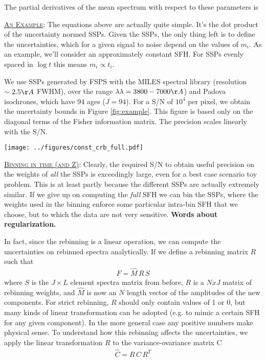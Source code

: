 \documentclass{article}
\begin{document}
The partial derivatives of the mean spectrum with respect to these parameters is 


\underline{\textsc{An Example}}:  
The equations above are actually quite simple.  
It's the dot product of the uncertainty normed SSPs. 
Given the SSPs, the only thing left is to define the uncertainties, which for a given signal to noise depend on the values of $m_i$.  
As an example, we'll consider an approximately constant SFH.  For SSPs evenly spaced in $\log t$ this means $m_i \propto t_i$.

We use SSPs generated by FSPS with 
the MILES spectral library (resolution $\sim 2.5\AA$ FWHM), over the range $\lambda\lambda = 3800-7000\AA$) and 
Padova isochrones, which have 94 ages ($J=94$).
For a S/N of $10^4$ per pixel, we obtain the uncertainty bounds in Figure \ref{fig:example}.
This figure is based only on the diagonal terms of the Fisher information matrix.
The precision scales linearly with the S/N.

\begin{figure*}[h!]
\texttt{[image: ../figures/const\_crb\_full.pdf]}
\caption{Top: Input masses and Cramer-Rao bound for a constant SFH, single metallicity, and S/N$= 10^4$, when including all 94 isochrone ages.  Bottom: Ratio of the input mass to the Cramer-Rao bound. 
\label{fig:example}}
\end{figure*}



\underline{\textsc{Binning in time (and Z)}}:
Clearly, the required S/N to obtain useful precision on the weights of \emph{all} the SSPs is exceedingly large, even for a best case scenario toy problem.  
This is at least partly because the different SSPs are actually extremely similar.  
If we give up on computing the \emph{full} SFH we can bin the SSPs, 
where the weights used in the binning enforce some particular intra-bin SFH that we choose, but to which the data are not very sensitive.
{\bf Words about regularization.}


In fact, since the rebinning is a linear operation, we can compute the uncertainties on rebinned spectra analytically.
If we define a rebinning matrix $R$ such that
\begin{eqnarray}
F = \hat{M} \, R \, S
\end{eqnarray}
where $S$ is the $J \times L$ element spectra matrix from before, $R$ is a $N x J$ matrix of rebinning weights, and $\hat{M}$ is now an $N$ length vector of the amplitudes of the new components.  
For strict rebinning, $R$ should only contain values of 1 or 0, 
but many kinds of linear transformation can be adopted (e.g. to mimic a certain SFH for any given component).
In the more general case any positive numbers make physical sense.
To understand how this rebinning affects the uncertainties, 
we apply the linear transformation $R$ to the variance-ovariance matrix C
\begin{eqnarray}
\hat{C} = R \, C  \, R^T
\end{eqnarray}
\end{document}
